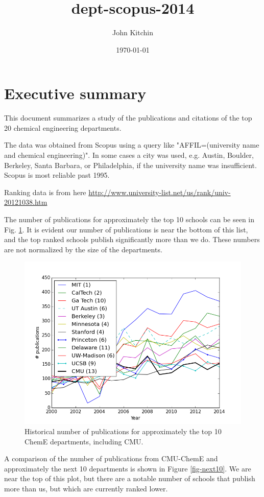 \documentclass[11pt]{article}
\author{John Kitchin}
\date{\today}
\title{dept-scopus-2014}
\begin{document}
\tableofcontents

\section{Executive summary}
\label{sec-1}
This document summarizes a study of the publications and citations of the top 20 chemical engineering departments.

The data was obtained from Scopus using a query like "AFFIL=(university name and chemical engineering)". In some cases a city was used, e.g. Austin, Boulder, Berkeley, Santa Barbara, or Philadelphia, if the university name was insufficient.
Scopus is most reliable past 1995.

Ranking data is from here \url{http://www.university-list.net/us/rank/univ-20121038.htm}

The number of publications for approximately the top 10 schools can be seen in Fig. \ref{fig-top10}. It is evident our number of publications is near the bottom of this list, and the top ranked schools publish significantly more than we do. These numbers are not normalized by the size of the departments.

\begin{figure}[htb]
\centering
\includegraphics[width=.9\linewidth]{./redone-top-10-publications.png}
\caption{Historical number of publications for approximately the top 10 ChemE departments, including CMU. \label{fig-top10}}
\end{figure}

A comparison of the number of publications from CMU-ChemE and approximately the next 10 departments is shown in Figure \ref{fig-next10}. We are near the top of this plot, but there are a notable number of schools that publish more than us, but which are currently ranked lower.
\end{document}
